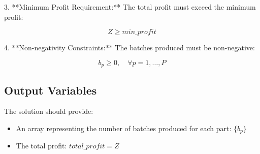 \documentclass{article}
\begin{document}
3. **Minimum Profit Requirement:**
   The total profit must exceed the minimum profit:

   \[
   Z \geq min\_profit
   \]

4. **Non-negativity Constraints:**
   The batches produced must be non-negative:

   \[
   b_p \geq 0, \quad \forall p = 1, \ldots, P
   \]

\subsection*{Output Variables}
The solution should provide:

\begin{itemize}
    \item An array representing the number of batches produced for each part: \( \{b_p\} \)
    \item The total profit: \( total\_profit = Z \)
\end{itemize}
\end{document}
